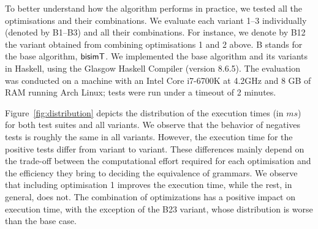 To better understand how the algorithm performs in practice, we tested
all the optimisations and their combinations. We evaluate each variant 
1--3 individually (denoted
by B1--B3) and all their combinations. For instance, we denote by B12
the variant obtained from combining optimisations 1 and 2 above.
B stands for the base algorithm, $\mathsf{bisimT}$.
%
We implemented the base algorithm and its
variants %
in Haskell, using the Glasgow Haskell Compiler (version
8.6.5).
The evaluation was conducted on a machine with an Intel Core i7-6700K
at 4.2GHz and 8 GB of RAM running Arch Linux; tests were run under a
timeout of 2 minutes.

%

Figure~\ref{fig:distribution} depicts the distribution of the
execution times (in $ms$) for both test suites and all variants. We
observe that the behavior of negatives tests is roughly the same in
all variants. However, the execution time for the positive tests
differ from variant to variant. These differences mainly depend on the
trade-off between the computational effort required for each
optimisation and the efficiency they bring to deciding the equivalence
of grammars.  We observe that including optimisation 1 improves the
execution time, while the rest, in general, does not. The combination
of optimizations has a positive impact on execution time, with the
exception of the B23 variant, whose distribution is worse than the
base case.

